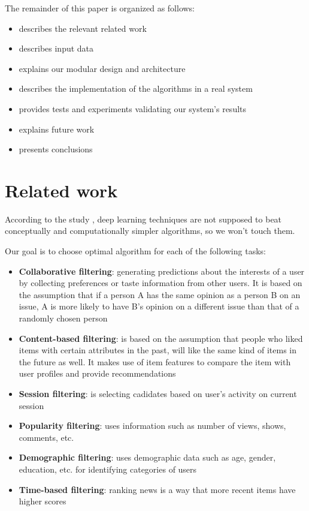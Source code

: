\documentclass{article}
\begin{document}
    The remainder of this paper is organized as follows:
    
        \begin{itemize}
            \item {} describes the relevant related work
            \item {} describes input data
            \item {} explains our modular design and architecture
            \item {} describes the implementation of the algorithms in a real system
            \item {} provides tests and experiments validating
our system’s results
            \item {} explains future work
            \item {} presents conclusions
        \end{itemize}



\section{Related work}
\label{sec:related}

According to the study \citep{progress}, deep learning techniques are not supposed to beat conceptually and computationally simpler algorithms, so we won't touch them.

Our goal is to choose optimal algorithm for each of the following tasks:

\begin{itemize}
    \item \textbf{Collaborative filtering}: generating predictions about the interests of a user by collecting preferences or taste information from other users. It is based on the assumption that if a person A has the same opinion as a person B on an issue, A is more likely to have B's opinion on a different issue than that of a randomly chosen person
    \item \textbf{Content-based filtering}: is based on the assumption that people who liked items with certain attributes in the past, will like the same kind of items in the future as well. It makes use of item features to compare the item with user profiles and provide recommendations
    \item \textbf{Session filtering}: is selecting cadidates based on user's activity on current session
    \item \textbf{Popularity filtering}: uses information such as number of views, shows, comments, etc.
    \item \textbf{Demographic filtering}: uses demographic data such as age, gender, education, etc. for identifying categories of users
    \item \textbf{Time-based filtering}: ranking news is a way that more recent items have higher scores
\end{itemize}
\end{document}
